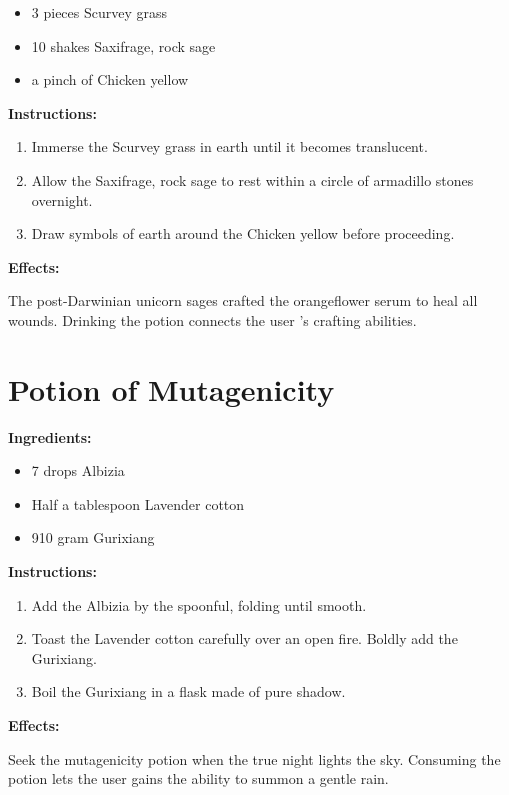 \documentclass{article}
\begin{document}
\begin{itemize}
  \item 3 pieces Scurvey grass
  \item 10 shakes Saxifrage, rock sage
  \item a pinch of Chicken yellow
\end{itemize}

\textbf{Instructions:}

\begin{enumerate}
  \item Immerse the Scurvey grass in earth until it becomes translucent.
  \item Allow the Saxifrage, rock sage to rest within a circle of armadillo stones overnight.
  \item Draw symbols of earth around the Chicken yellow before proceeding.
\end{enumerate}

\textbf{Effects:}

The post-Darwinian unicorn sages crafted the orangeflower serum to heal all wounds. Drinking the potion connects the user 's crafting abilities.

\newpage
\section*{Potion of Mutagenicity}

\textbf{Ingredients:}

\begin{itemize}
  \item 7 drops Albizia
  \item Half a tablespoon Lavender cotton
  \item 910 gram Gurixiang
\end{itemize}

\textbf{Instructions:}

\begin{enumerate}
  \item Add the Albizia by the spoonful, folding until smooth.
  \item Toast the Lavender cotton carefully over an open fire. Boldly add the Gurixiang.
  \item Boil the Gurixiang in a flask made of pure shadow.
\end{enumerate}

\textbf{Effects:}

Seek the mutagenicity potion when the true night lights the sky. Consuming the potion lets the user gains the ability to summon a gentle rain.
\end{document}
